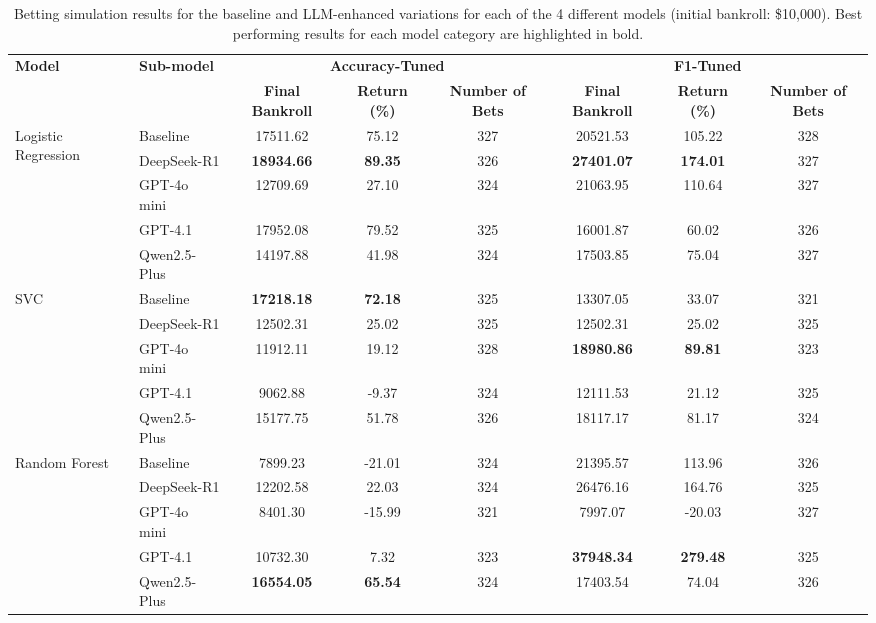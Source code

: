 \documentclass[conference]{IEEEtran}
\begin{document}
\begin{table}[htbp]
\caption{Betting simulation results for the baseline and LLM-enhanced variations for each of the 4 different models (initial bankroll: \$10,000). Best performing results for each model category are highlighted in bold.}
\label{tab:betting_simulation_results}
\centering
\scriptsize
\renewcommand{\arraystretch}{1.2}
\begin{tabular}{l l c c c c c c}
\hline
\multirow{2}{*}{\textbf{Model}} & \multirow{2}{*}{\textbf{Sub-model}} & \multicolumn{3}{c}{\textbf{Accuracy-Tuned}} & \multicolumn{3}{c}{\textbf{F1-Tuned}} \\
\cline{3-8}
& & \textbf{Final Bankroll} & \textbf{Return (\%)} & \textbf{Number of Bets} & \textbf{Final Bankroll} & \textbf{Return (\%)} & \textbf{Number of Bets} \\
\hline
\multirow{5}{*}{Logistic Regression} 
& Baseline & 17511.62 & 75.12 & 327 & 20521.53 & 105.22 & 328 \\
& DeepSeek-R1 & \textbf{18934.66} & \textbf{89.35} & 326 & \textbf{27401.07} & \textbf{174.01} & 327 \\
& GPT-4o mini & 12709.69 & 27.10 & 324 & 21063.95 & 110.64 & 327 \\
& GPT-4.1 & 17952.08 & 79.52 & 325 & 16001.87 & 60.02 & 326 \\
& Qwen2.5-Plus & 14197.88 & 41.98 & 324 & 17503.85 & 75.04 & 327 \\
\hline
\multirow{5}{*}{SVC}
& Baseline & \textbf{17218.18} & \textbf{72.18} & 325 & 13307.05 & 33.07 & 321 \\
& DeepSeek-R1 & 12502.31 & 25.02 & 325 & 12502.31 & 25.02 & 325 \\
& GPT-4o mini & 11912.11 & 19.12 & 328 & \textbf{18980.86} & \textbf{89.81} & 323 \\
& GPT-4.1 & 9062.88 & -9.37 & 324 & 12111.53 & 21.12 & 325 \\
& Qwen2.5-Plus & 15177.75 & 51.78 & 326 & 18117.17 & 81.17 & 324 \\
\hline
\multirow{5}{*}{Random Forest}
& Baseline & 7899.23 & -21.01 & 324 & 21395.57 & 113.96 & 326 \\
& DeepSeek-R1 & 12202.58 & 22.03 & 324 & 26476.16 & 164.76 & 325 \\
& GPT-4o mini & 8401.30 & -15.99 & 321 & 7997.07 & -20.03 & 327 \\
& GPT-4.1 & 10732.30 & 7.32 & 323 & \textbf{37948.34} & \textbf{279.48} & 325 \\
& Qwen2.5-Plus & \textbf{16554.05} & \textbf{65.54} & 324 & 17403.54 & 74.04 & 326 \\

\end{tabular}
\end{table}
\end{document}
